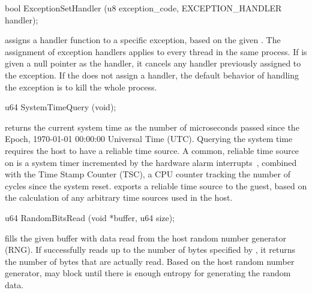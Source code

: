 \begin{paldef}
bool ExceptionSetHandler (u8 exception_code,
                          EXCEPTION_HANDLER handler);
\end{paldef}

 assigns a handler function to a specific exception, based on the given .
The assignment of exception handlers
applies to every thread in the same process.
If  is given a null pointer as the handler,
it cancels any handler previously assigned to the exception.
If the \libos{} does not assign a handler,
the default behavior of handling the exception is to kill the whole process.












\begin{paldef}
u64 SystemTimeQuery (void);
\end{paldef}


 returns the current system time as
the number of microseconds passed since the Epoch, 1970-01-01 00:00:00 Universal Time (UTC).
Querying the system time
requires the host to have a reliable time source.
A common, reliable time source on \graphenearch{}
is a system timer incremented by the hardware alarm interrupts~\cite{love10linux-kernel},
combined with the Time Stamp Counter (TSC), a CPU counter tracking the number of cycles since the system reset.
 exports a reliable time source
to the guest, based on the calculation of any arbitrary time sources used in the host.







\begin{paldef}
u64 RandomBitsRead (void *buffer, u64 size);
\end{paldef}


 fills the given buffer with data read from the host random number generator (RNG).
If  successfully reads up to the number of bytes
specified by , it returns the number of bytes that are actually read.
Based on the host random number generator,
 may block until there is enough entropy for generating the random data.


